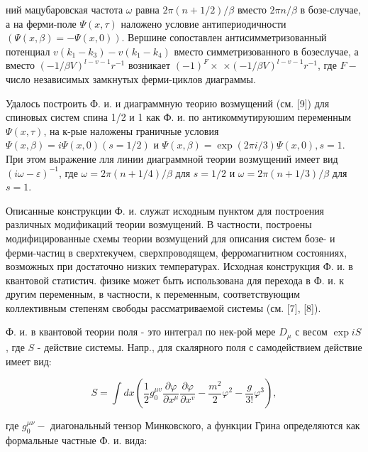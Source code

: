 \documentclass[10pt]{article}
\begin{document}
ний мацубаровская частота $\omega$ равна $2 \pi(n+1 / 2) / \beta$ вместо $2 \pi n / \beta$ в бозе-случае, а на ферми-поле $\Psi(x, \tau)$ наложено условие антипериодичности $(\Psi(x, \beta)=-\Psi(x, 0))$. Вершине сопоставлен антисимметризованный потенциал $v\left(k_{1}-k_{3}\right)-v\left(k_{1}-k_{4}\right)$ вместо симметризованного в бозеслучае, а вместо $(-1 / \beta V)^{l-v-1} r^{-1}$ возникает $(-1)^{F} \times$ $\times(-1 / \beta V)^{l-v-1} r^{-1}$, где $F-$ число независимых замкнутых ферми-циклов диаграммы.



Удалось построить Ф. и. и диаграммную теорию возмущений (см. [9]) для спиновых систем спина 1/2 и 1 как Ф. и. по антикоммутируюшим переменным $\Psi(x, \tau)$, на к-рые наложены граничные условия $\Psi(x, \beta)=i \Psi(x, 0)(s=1 / 2)$ и $\Psi(x, \beta)=\exp (2 \pi i / 3) \Psi(x, 0), s=1$. При этом выражение лля линии диаграммной теории возмущений имеет вид $(i \omega-\varepsilon)^{-1}$, где $\omega=2 \pi(n+1 / 4) / \beta$ для $s=1 / 2$ и $\omega=2 \pi(n+1 / 3) / \beta$ для $s=1$.



Описанные конструкции Ф. и. служат исходным пунктом для построения различных модификаций теории возмущений. В частности, построены модифицированные схемы теории возмущений для описания систем бозе- и ферми-частиц в сверхтекучем, сверхпроводящем, ферромагнитном состояниях, возможных при достаточно низких температурах. Исходная конструкция Ф. и. в квантовой статистич. физике может быть использована для перехода в Ф. и. к другим переменным, в частности, к переменным, соответствующим коллективным степеням свободы рассматриваемой системы (см. [7], [8]).



Ф. и. в квантовой теории поля - это интеграл по нек-рой мере $D_{\mu}$ с весом $\exp i S$, где $S$ - действие системы. Напр., для скалярного поля с самодействием действие имеет вид:



\[

S=\int d x\left(\frac{1}{2} g_{0}^{\mu v} \frac{\partial \varphi}{\partial x^{\mu}} \frac{\partial \varphi}{\partial x^{v}}-\frac{m^{2}}{2} \varphi^{2}-\frac{g}{3 !} \varphi^{3}\right),

\]



где $g_{0}^{\mu \nu}-$ диагональный тензор Минковского, а функции Грина определяются как формальные частные Ф. и. вида:
\end{document}
